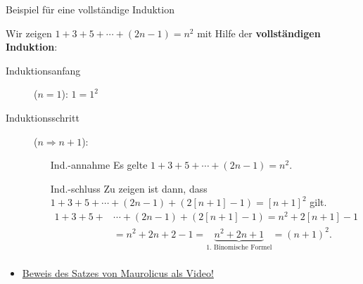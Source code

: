 \documentclass[12pt,ngerman,a4paper,ignorenonframetext,]{beamer}
\providecommand{\tightlist}{%
  \setlength{\itemsep}{0pt}\setlength{\parskip}{0pt}}
\begin{document}
\begin{frame}{Beispiel für eine vollständige Induktion}
\protect\hypertarget{beispiel-fur-eine-vollstandige-induktion-1}{}


\begin{Beweis}

Wir zeigen \(1 + 3 + 5 + \cdots + (2n-1) = n^2\) mit Hilfe der
\textbf{vollständigen Induktion}: \small

\begin{description}
        \item[\glqq Induktionsanfang\grqq] ($n=1$):
            $\displaystyle 1 = 1^2 $  
        \item[\glqq Induktionsschritt\grqq] ($n \Longrightarrow n+1$):
        
            \begin{itemize}
                \item[\glqq Ind.-annahme \grqq]
                    Es gelte $\displaystyle 1+3+5+\cdots + (2n-1) =n^2$.  
                \item[\glqq Ind.-schluss\grqq]  
            Zu zeigen ist dann, dass
            $\displaystyle 1+3+5+\cdots + (2n-1) + (2[n+1]-1) =[n+1]^2$
            gilt.  
            \begin{align*}
                1+3+5+ &\cdots + (2n-1) + (2[n+1]-1)
                        = n^2 + 2 [n+1] -1 \\
                        &= n^2 + 2n + 2 -1
                        = \underbrace{n^2 +2 n +1}_{\text{1. Binomische Formel}}
                        = (n+1)^2. \\
            \end{align*}
            \end{itemize}
\end{description}

\end{Beweis}


\begin{Bemerkung}

\begin{itemize}
\tightlist
\item
  \href{https://youtu.be/y8B8fl_usm0}{Beweis des Satzes von Maurolicus
  als Video!}
\end{itemize}

\end{Bemerkung}

\end{frame}
\end{document}
